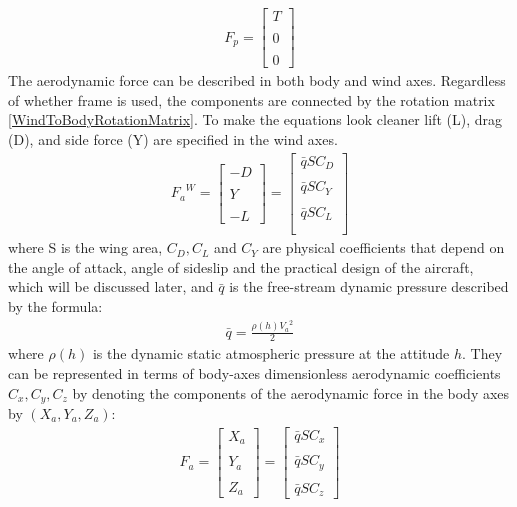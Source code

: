 \documentclass[twocolumn,showpacs,
    nofootinbib,aps,superscriptaddress,
    eqsecnum,prd,showkeys,10pt,floatfix]{revtex4}
\begin{document}
\begin{align}
    F_p=\begin{bmatrix}
            T \\\\
            0 \\\\
            0
        \end{bmatrix}
    \label{ThrustInPropulsionVector}
\end{align}
The aerodynamic force can be described in both body and wind axes. Regardless of whether frame is used, the components are connected by the rotation matrix {\ref{WindToBodyRotationMatrix}}.
To make the equations look cleaner lift (L), drag (D), and side force (Y) are specified in the wind axes.
\begin{align}
    {F_a}^W=\begin{bmatrix}
                -D \\\\
                Y  \\\\
                -L
            \end{bmatrix}=
    \begin{bmatrix}
        \bar{q}S{C_D} \\\\
        \bar{q}S{C_Y} \\\\
        \bar{q}S{C_L} \\\\
    \end{bmatrix}
    \label{AerodynamicForceInTermsOfDynamicPressureInTheWindFrame}
\end{align} where S is the wing area, $C_D,C_L$ and $C_Y$ are physical coefficients that depend on the angle of attack, angle of sideslip and the practical design of the aircraft, which will be discussed later, and $\bar{q}$ is the free-stream dynamic pressure described by the formula:
\begin{align}
    \bar{q}=\frac{\rho(h){V_a}^2}{2}
\end{align}
where $\rho(h)$ is the dynamic static atmospheric pressure at the attitude $h$. They can be represented in terms of body-axes dimensionless aerodynamic coefficients $C_x,C_y,C_z$ by denoting the components of the aerodynamic force in the body axes by $(X_a,Y_a,Z_a)$:
\begin{align}
    F_a=\begin{bmatrix}
            X_a \\\\
            Y_a \\\\
            Z_a
        \end{bmatrix}=
    \begin{bmatrix}
        \bar{q}S{C_x} \\\\
        \bar{q}S{C_y} \\\\
        \bar{q}S{C_z}
    \end{bmatrix}
    \label{AerodynamicForceInTermsOfDynamicPressureInTheBodyFrame}
\end{align}
\end{document}
